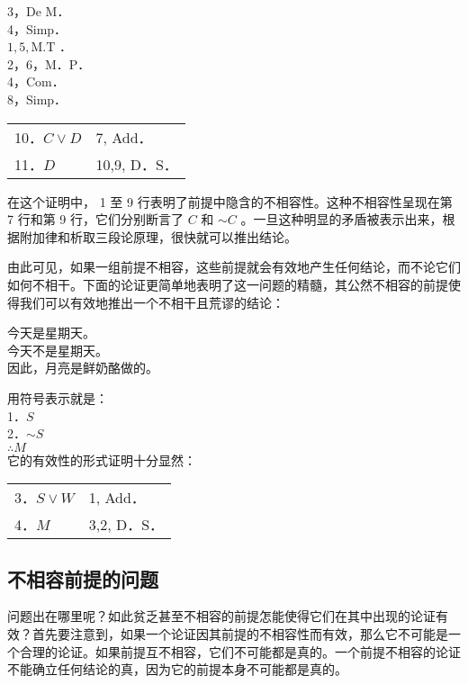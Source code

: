 3，De M．\\
4，Simp．\\
$1,5, \mathrm{M} . \mathrm{T}$ ．\\
2，6，M．P．\\
4，Com．\\
8，Simp．

\begin{center}
\begin{tabular}{ll}
10．$C \vee D$ & 7, Add． \\
11．$D$ & 10,9, D．S． \\
\end{tabular}
\end{center}

在这个证明中， 1 至 9 行表明了前提中隐含的不相容性。这种不相容性呈现在第 7 行和第 9 行，它们分别断言了 $C$ 和 $\sim C$ 。一旦这种明显的矛盾被表示出来，根据附加律和析取三段论原理，很快就可以推出结论。

由此可见，如果一组前提不相容，这些前提就会有效地产生任何结论，而不论它们如何不相干。下面的论证更简单地表明了这一问题的精髓，其公然不相容的前提使得我们可以有效地推出一个不相干且荒谬的结论：

今天是星期天。\\
今天不是星期天。\\
因此，月亮是鲜奶酪做的。

用符号表示就是：\\
1．$S$\\
2．$\sim S$\\
$\therefore M$\\
它的有效性的形式证明十分显然：

\begin{center}
\begin{tabular}{ll}
3．$S \vee W$ & 1, Add． \\
4．$M$ & 3,2, D．S． \\
\end{tabular}
\end{center}

\subsection{不相容前提的问题}

问题出在哪里呢？如此贫乏甚至不相容的前提怎能使得它们在其中出现的论证有效？首先要注意到，如果一个论证因其前提的不相容性而有效，那么它不可能是一个合理的论证。如果前提互不相容，它们不可能都是真的。一个前提不相容的论证不能确立任何结论的真，因为它的前提本身不可能都是真的。

